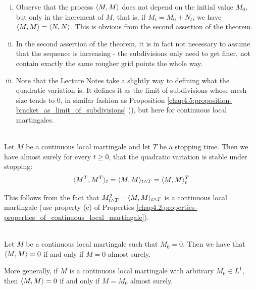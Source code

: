 \begin{remark}\label{chap4.3:remark-remarks_on_quadratic_variation_definition}
\begin{enumerate}[(i)]
    \item Observe that the process $\langle M,M\rangle$ does not depend on the initial value $M_0$, but only in the increment of $M$, that is, if $M_t=M_0+N_t$, we have $\langle M,M\rangle=\langle N,N\rangle$. This is obvious from the second assertion of the theorem.
    \item In the second assertion of the theorem, it is in fact not necessary to assume that the sequence is increasing - the subdivisions only need to get finer, not contain exactly the same rougher grid points the whole way.
    \item Note that the Lecture Notes take a slightly way to defining what the quadratic variation is. It defines it as the limit of subdivisions whose mesh size tends to 0, in similar fashion as Proposition \ref{chap4.5:proposition-bracket_as_limit_of_subdivisions} (), but here for continuous local martingales.
\end{enumerate}
\end{remark}

\begin{proposition}\label{chap4.3:proposition-stopping_a_quadratic_variation}
 \\
Let $M$ be a continuous local martingale and let $T$ be a stopping time. Then we have almost surely for every $t \geq 0$, that the quadratic variation is stable under stopping:
$$\langle M^T, M^T\rangle_t=\langle M,M\rangle_{t \land T}=\langle M,M\rangle_t^T$$
\end{proposition}
This follows from the fact that $M^2_{t \land T} - \langle M,M\rangle_{t \land T}$ is a continuous local martingale (use property (c) of Properties \ref{chap4.2:properties-properties_of_continuous_local_martingale}).

\begin{proposition}\label{chap4.3:proposition-constant_quadratic_variation_gives_constant_continuous_local_martingale}
 \\
Let $M$ be a continuous local martingale such that $M_0=0$. Then we have that $\langle M,M\rangle=0$ if and only if $M=0$ almost surely.

More generally, if $M$ is a continuous local martingale with arbitrary $M_0 \in L^1$, then $\langle M,M\rangle=0$ if and only if $M=M_0$ almost surely.
\end{proposition}

